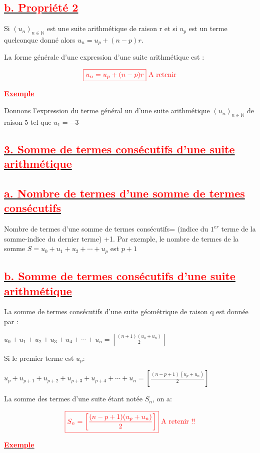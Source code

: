\documentclass[12pt]{article}
\begin{document}
\subsection*{\underline{\textbf{\textcolor{red}{b. Propriété 2}}}}
Si $(u_{n})_{n\in\mathbb{N}}$ est une suite arithmétique de raison r et si $u_{p}$ est un terme quelconque donné alors $u_{n} = u_{p} +(n - p)r$.

La forme générale d'une expression d'une suite arithmétique est :  

\[\textcolor{red}{\boxed{u_{n} = u_{p} + (n-p)r} \text{ A retenir}}\]

\underline{\textbf{\textcolor{red}{Exemple}}}

Donnons l’expression du terme général un d’une suite arithmétique $(u_{n})_{n\in\mathbb{N}}$  de raison 5 tel que $u_{1} = -3$
\subsection*{\underline{\textbf{\textcolor{red}{3. Somme de termes consécutifs d’une suite arithmétique}}}}
\subsection*{\underline{\textbf{\textcolor{red}{a. Nombre de termes d’une somme de termes consécutifs}}}}
Nombre de termes d’une somme de termes consécutifs= (indice du $1^{er}$ terme de la somme-indice du dernier
terme) +1. Par exemple, le nombre de termes de la somme $S = u_{0} + u_{1} + u_{2} +\cdots+u_{p}$ est $p+1$
\subsection*{\underline{\textbf{\textcolor{red}{b. Somme de termes consécutifs d’une suite arithmétique}}}}
La somme de termes consécutifs d’une suite géométrique de raison q est donnée par :

$u_{0}+u_{1}+u_{2}+u_{3}+u_{4}+\cdots+u_{n}=\left[\frac{(n+1)(u_{0}+u_{n})}{2} \right] $

Si le premier terme  est $u_{p}$:

$u_{p}+u_{p+1}+u_{p+2}+u_{p+3}+u_{p+4}+\cdots+u_{n}=\left[\frac{(n-p+1)(u_{p}+u_{n})}{2} \right]$

La somme des termes d'une suite étant notée $S_{n}$, on a:

\[\textcolor{red}{\boxed{S_{n}=\left[\frac{(n-p+1)(u_{p}+u_{n})}{2} \right]}\text{ A retenir !!}}\]

\underline{\textbf{\textcolor{red}{Exemple}}}
\end{document}

